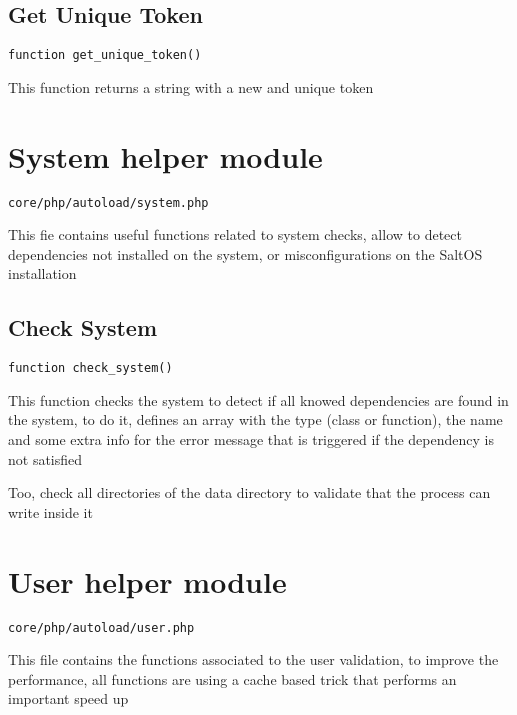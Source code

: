 \documentclass[a4paper]{book}
\begin{document}
\hypertarget{toc263}{}
\subsection{Get Unique Token}

\begin{lstlisting}
function get_unique_token()
\end{lstlisting}

This function returns a string with a new and unique token

\hypertarget{toc264}{}
\section{System helper module}

\begin{lstlisting}
core/php/autoload/system.php
\end{lstlisting}

This fie contains useful functions related to system checks, allow to detect dependencies not
installed on the system, or misconfigurations on the SaltOS installation

\hypertarget{toc265}{}
\subsection{Check System}

\begin{lstlisting}
function check_system()
\end{lstlisting}

This function checks the system to detect if all knowed dependencies are found in the system, to do it,
defines an array with the type (class or function), the name and some extra info for the error message
that is triggered if the dependency is not satisfied

Too, check all directories of the data directory to validate that the process can write inside it

\hypertarget{toc266}{}
\section{User helper module}

\begin{lstlisting}
core/php/autoload/user.php
\end{lstlisting}

This file contains the functions associated to the user validation, to
improve the performance, all functions are using a cache based trick
that performs an important speed up
\end{document}
